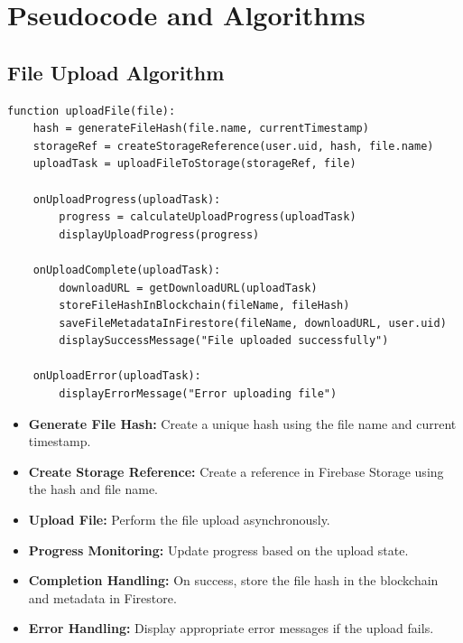 \documentclass[12pt,a4paper]{report}
\begin{document}
\section{Pseudocode and Algorithms}

\subsection{File Upload Algorithm}

\begin{lstlisting}[caption=File Upload Algorithm]
   function uploadFile(file):
    hash = generateFileHash(file.name, currentTimestamp)
    storageRef = createStorageReference(user.uid, hash, file.name)
    uploadTask = uploadFileToStorage(storageRef, file)

    onUploadProgress(uploadTask):
        progress = calculateUploadProgress(uploadTask)
        displayUploadProgress(progress)

    onUploadComplete(uploadTask):
        downloadURL = getDownloadURL(uploadTask)
        storeFileHashInBlockchain(fileName, fileHash)
        saveFileMetadataInFirestore(fileName, downloadURL, user.uid)
        displaySuccessMessage("File uploaded successfully")

    onUploadError(uploadTask):
        displayErrorMessage("Error uploading file")

   \end{lstlisting}
   
\begin{itemize}
   \item \textbf{Generate File Hash:} Create a unique hash using the file name and current timestamp.
   \item \textbf{Create Storage Reference:} Create a reference in Firebase Storage using the hash and file name.
   \item \textbf{Upload File:} Perform the file upload asynchronously.
   \item \textbf{Progress Monitoring:} Update progress based on the upload state.
   \item \textbf{Completion Handling:} On success, store the file hash in the blockchain and metadata in Firestore.
   \item \textbf{Error Handling:} Display appropriate error messages if the upload fails.
\end{itemize}
\end{document}
